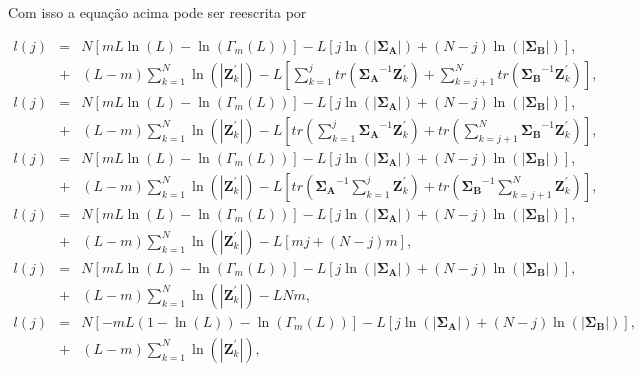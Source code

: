 \documentclass[12pt,a4paper]{article}
\begin{document}
Com isso a equação acima pode ser reescrita por

\begin{equation*}
\begin{array}{rcl}
	l(j)&=&N\left[mL\ln{\left(L\right)}-\ln{\left(\Gamma_m(L)\right)}\right]-L\left[j\ln{\left(|\mathbf{\Sigma_{A}}|\right)} +(N-j)\ln{\left(|\mathbf{\Sigma_{B}}|\right)}\right], \\
	&+&(L-m)\sum_{k=1}^{N}\ln{\left(|\mathbf{Z}_{k}^{'}|\right)}-L\left[\sum_{k=1}^{j}tr(\mathbf{\Sigma_{A}}^{-1}\mathbf{Z}_{k}^{'})+ \sum_{k=j+1}^{N}tr(\mathbf{\Sigma_{B}}^{-1}\mathbf{Z}_{k}^{'})\right], \\
	l(j)&=&N\left[mL\ln{\left(L\right)}-\ln{\left(\Gamma_m(L)\right)}\right]-L\left[j\ln{\left(|\mathbf{\Sigma_{A}}|\right)} +(N-j)\ln{\left(|\mathbf{\Sigma_{B}}|\right)}\right], \\
	&+&(L-m)\sum_{k=1}^{N}\ln{\left(|\mathbf{Z}_{k}^{'}|\right)}-L\left[tr\left(\sum_{k=1}^{j}\mathbf{\Sigma_{A}}^{-1}\mathbf{Z}_{k}^{'}\right)+tr\left( \sum_{k=j+1}^{N}\mathbf{\Sigma_{B}}^{-1}\mathbf{Z}_{k}^{'}\right)\right], \\
	l(j)&=&N\left[mL\ln{\left(L\right)}-\ln{\left(\Gamma_m(L)\right)}\right]-L\left[j\ln{\left(|\mathbf{\Sigma_{A}}|\right)} +(N-j)\ln{\left(|\mathbf{\Sigma_{B}}|\right)}\right], \\
	&+&(L-m)\sum_{k=1}^{N}\ln{\left(|\mathbf{Z}_{k}^{'}|\right)}-L\left[tr\left(\mathbf{\Sigma_{A}}^{-1}\sum_{k=1}^{j}\mathbf{Z}_{k}^{'}\right)+tr\left( \mathbf{\Sigma_{B}}^{-1}\sum_{k=j+1}^{N}\mathbf{Z}_{k}^{'}\right)\right], \\
	l(j)&=&N\left[mL\ln{\left(L\right)}-\ln{\left(\Gamma_m(L)\right)}\right]-L\left[j\ln{\left(|\mathbf{\Sigma_{A}}|\right)} +(N-j)\ln{\left(|\mathbf{\Sigma_{B}}|\right)}\right], \\
	&+&(L-m)\sum_{k=1}^{N}\ln{\left(|\mathbf{Z}_{k}^{'}|\right)}-L\left[mj+(N-j)m\right], \\
	l(j)&=&N\left[mL\ln{\left(L\right)}-\ln{\left(\Gamma_m(L)\right)}\right]-L\left[j\ln{\left(|\mathbf{\Sigma_{A}}|\right)} +(N-j)\ln{\left(|\mathbf{\Sigma_{B}}|\right)}\right], \\
	&+&(L-m)\sum_{k=1}^{N}\ln{\left(|\mathbf{Z}_{k}^{'}|\right)}-LNm, \\
	l(j)&=&N\left[-mL(1-\ln{\left(L\right)})-\ln{\left(\Gamma_m(L)\right)}\right]-L\left[j\ln{\left(|\mathbf{\Sigma_{A}}|\right)} +(N-j)\ln{\left(|\mathbf{\Sigma_{B}}|\right)}\right], \\
	&+&(L-m)\sum_{k=1}^{N}\ln{\left(|\mathbf{Z}_{k}^{'}|\right)}, \\
\end{array}
\end{equation*}
\end{document}
